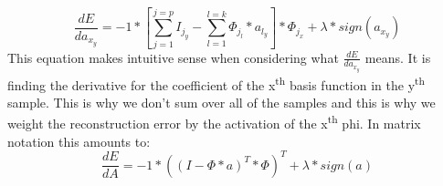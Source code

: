 \documentclass{article}
\begin{document}
\begin{equation}
    \frac{dE}{da_x_y} = -1 * [\sum_{j=1}^{j=p}I_j_y - \sum_{l=1}^{l=k}\Phi_j_l* a_l_y]*\Phi_j_x + \lambda * sign(a_x_y)
\end{equation}
This equation makes intuitive sense when considering what $\frac{dE}{da_x_y}$ means. It is finding the derivative for the coefficient of the x\textsuperscript{th} basis function in the y\textsuperscript{th} sample. This is why we don't sum over all of the samples and this is why we weight the reconstruction error by the activation of the x\textsuperscript{th} phi. In matrix notation this amounts to:
\begin{equation}
    \frac{dE}{dA} = -1 * ((I - \Phi*a)^T*\Phi)^T + \lambda*sign(a)
\end{equation}
\end{document}
